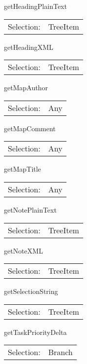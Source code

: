 \item getHeadingPlainText\\
\begin{tabular}{rl}
  Selection: & TreeItem\\
\end{tabular}

\item getHeadingXML\\
\begin{tabular}{rl}
  Selection: & TreeItem\\
\end{tabular}

\item getMapAuthor\\
\begin{tabular}{rl}
  Selection: & Any\\
\end{tabular}

\item getMapComment\\
\begin{tabular}{rl}
  Selection: & Any\\
\end{tabular}

\item getMapTitle\\
\begin{tabular}{rl}
  Selection: & Any\\
\end{tabular}

\item getNotePlainText\\
\begin{tabular}{rl}
  Selection: & TreeItem\\
\end{tabular}

\item getNoteXML\\
\begin{tabular}{rl}
  Selection: & TreeItem\\
\end{tabular}

\item getSelectionString\\
\begin{tabular}{rl}
  Selection: & TreeItem\\
\end{tabular}

\item getTaskPriorityDelta\\
\begin{tabular}{rl}
  Selection: & Branch\\
\end{tabular}

